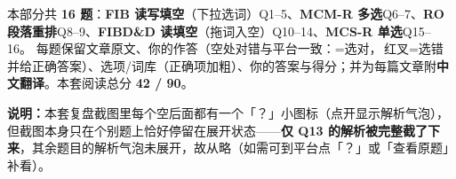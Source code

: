
\vspace{1mm}
{\small\color{gray} 本部分共 \textbf{16 题}：\textbf{FIB 读写填空}（下拉选词）Q1--5、\textbf{MCM-R 多选}Q6--7、\textbf{RO 段落重排}Q8--9、\textbf{FIBD\&D 读填空}（拖词入空）Q10--14、\textbf{MCS-R 单选}Q15--16。
每题保留文章原文、你的作答（空处对错与平台一致：=选对，{\color{cWrong}}\,红叉=选错并给正确答案）、选项/词库（正确项加粗）、你的答案与得分；并为每篇文章附\textbf{中文翻译}。本套阅读总分 \textbf{42 / 90}。}
\vspace{1mm}

{\small\color{gray}\textbf{说明：}本套复盘截图里每个空后面都有一个「？」小图标（点开显示解析气泡），但截图本身只在个别题上恰好停留在展开状态——\textbf{仅 Q13 的解析被完整截了下来}，其余题目的解析气泡未展开，故从略（如需可到平台点「？」或「查看原题」补看）。}
\vspace{2mm}


